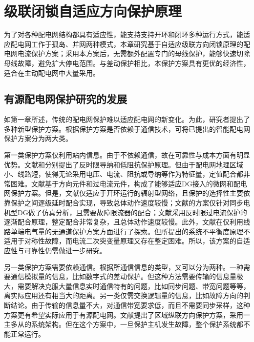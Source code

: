 \chapter{级联闭锁自适应方向保护原理}

为了对各种配电网结构都具有适应性，能支持支持开环和闭环多种运行方式，能适应配电网工作于孤岛、并网两种模式，本章研究基于自适应级联方向闭锁原理的配电网电流保护方案；采用本方案后，无需额外配置专门的母线保护，能够快速切除母线故障，避免扩大停电范围。与差动保护相比，本保护方案具有更优的经济性，适合在主动配电网中大量采用。

\section{有源配电网保护研究的发展}

如第一章所述，传统的配电网保护难以适应配电网的新变化。为此，研究者提出了多种新型保护方案。根据保护方案是否依赖于通信技术，可将已提出的智能配电网保护方案分为两大类。

第一类保护方案仅利用站内信息。由于不依赖通信，故在可靠性与成本方面有明显优势。文献\cite{dewadasa2010fold}和\cite{wentao2014wei}分别提出了反时限导纳和低阻抗保护原理。但由于配电网地理区域小、线路短，使得无论采用电压、电流、阻抗或导纳等作为特征量，定值配合都非常困难。文献\cite{zamani2011protection,najy2013optimal,hsieh2014adaptive,zeineldin2015optimal}基于方向元件和过电流元件，构成了能够适应DG接入的微网和配电网保护方案。但是，文献\cite{zamani2011protection}仅适应于开环运行的辐射型网络，且保护的选择性主要依靠保护之间逐级延时配合实现，导致总体动作速度较慢；文献\cite{najy2013optimal}的方案仅针对同步电机型DG做了仿真分析，且需要故障限流器的配合；文献\cite{hsieh2014adaptive,zeineldin2015optimal}采用反时限过电流保护的逐渐配合原理，整定配合非常复杂，且总体动作速度较慢。此外，文献\cite{ganzhong2002shu}在仅利用线路单端电气量的无通道保护方案方面进行了探索。但所提出的系统不平衡度原理不适用于对称性故障，而电流二次突变量原理又存在整定困难。所以，该方案的自适应性与可靠性仍需做进一步研究。

另一类保护方案需要依赖通信。根据所通信信息的类型，又可以分为两种。一种需要通信模拟量的信息，比如数字式的差动保护\cite{qing2014recent}。但这种方法需要传输的信息量极大，需要解决克服大量信息实时通信特有的问题，比如同步问题、带宽问题等等，离实际应用还有相当大的距离。另一类仅需交换逻辑量的信息，比如故障方向的判断结论。由于传输的信息量不大，对通信带宽要求低，而且不需要同步采样，这种方案更有希望实际应用于有源配电网。文献\cite{wangwei2009}提出了区域纵联方向保护方案，采用一主多从的系统架构。但在这个方案中，一旦保护主机发生故障，整个保护系统都不能正常运行。

